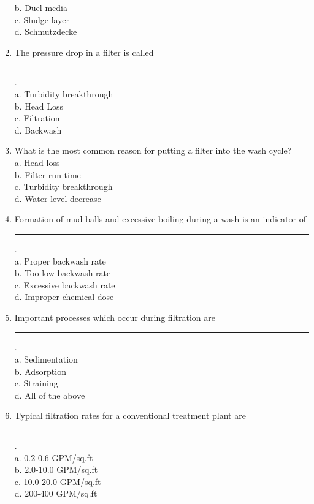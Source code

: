 \begin{enumerate}
b.	Duel media\\
c.	Sludge layer\\
d.	Schmutzdecke\\
\item The pressure drop in a filter is called \rule{1.5cm}{0.5pt}.\\
a.	Turbidity breakthrough\\
b.	Head Loss\\
c.	Filtration\\
d.	Backwash\\
\item What is the most common reason for putting a filter into the wash cycle?\\
a.	Head loss\\
b.	Filter run time\\
c.	Turbidity breakthrough\\
d.	Water level decrease\\
\item Formation of mud balls and excessive boiling during a wash is an indicator of \rule{1.5cm}{0.5pt}.\\
a.	Proper backwash rate\\
b.	Too low backwash rate\\
c.	Excessive backwash rate\\
d.	Improper chemical dose\\
\item Important processes which occur during filtration are \rule{1.5cm}{0.5pt}.\\
a.	Sedimentation\\
b.	Adsorption\\
c.	Straining\\
d.	All of the above\\
\item Typical filtration rates for a conventional treatment plant are \rule{1.5cm}{0.5pt}.\\
a.	0.2-0.6 GPM/sq.ft\\
b.	2.0-10.0 GPM/sq.ft\\
c.	10.0-20.0 GPM/sq.ft\\
d.	200-400 GPM/sq.ft\\


\end{enumerate}
